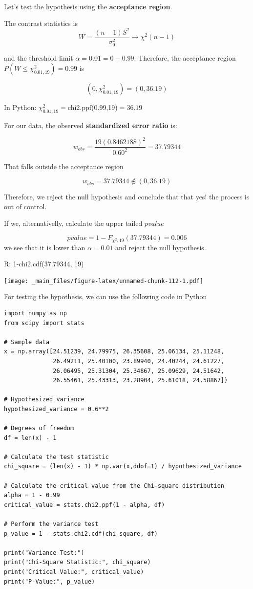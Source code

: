 \documentclass[
]{book}
\begin{document}
Let's test the hypothesis using the \textbf{acceptance region}.

The contrast statistics is \[W=\frac{(n-1)S^2}{\sigma_0^2} \rightarrow \chi^2(n-1)\]

and the threshold limit \(\alpha=0.01=0-0.99\). Therefore, the acceptance region \(P(W\leq \chi^2_{0.01,19})=0.99\) is

\[(0, \chi^2_{0.01,19})=(0,36.19)\]

In Python: \(\chi^2_{0.01,19}=\)chi2.ppf(0.99,19)\(= 36.19\)

For our data, the observed \textbf{standardized error ratio} is:

\[w_{obs}=\frac{19 (0.8462188)^2}{0.60^2}=37.79344\]

That falls outside the acceptance region

\[w_{obs}=37.79344\notin (0,36.19)\]

Therefore, we reject the null hypothesis and conclude that that yes! the process is out of control.

If we, alternativelly, calculate the upper tailed \(pvalue\)

\[pvalue=1-F_{\chi^2,19}(37.79344)= 0.006\]
we see that it is lower than \(\alpha=0.01\) and reject the null hypothesis.

R: 1-chi2.cdf(37.79344, 19)

\texttt{[image: \_main\_files/figure-latex/unnamed-chunk-112-1.pdf]}

For testing the hypothesis, we can use the following code in Python

\begin{verbatim}
import numpy as np
from scipy import stats

# Sample data
x = np.array([24.51239, 24.79975, 26.35608, 25.06134, 25.11248, 
              26.49211, 25.40100, 23.89940, 24.40244, 24.61227, 
              26.06495, 25.31304, 25.34867, 25.09629, 24.51642, 
              26.55461, 25.43313, 23.28904, 25.61018, 24.58867])

# Hypothesized variance
hypothesized_variance = 0.6**2

# Degrees of freedom
df = len(x) - 1

# Calculate the test statistic
chi_square = (len(x) - 1) * np.var(x,ddof=1) / hypothesized_variance

# Calculate the critical value from the Chi-square distribution
alpha = 1 - 0.99
critical_value = stats.chi2.ppf(1 - alpha, df)

# Perform the variance test
p_value = 1 - stats.chi2.cdf(chi_square, df)

print("Variance Test:")
print("Chi-Square Statistic:", chi_square)
print("Critical Value:", critical_value)
print("P-Value:", p_value)
\end{verbatim}
\end{document}
